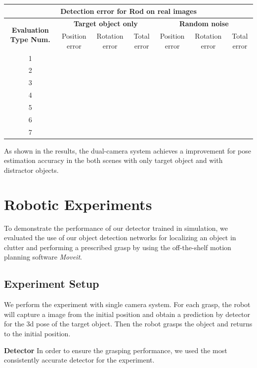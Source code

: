 \begin{table}[]
	\begin{tabular}{|c|c|c|c|c|c|c|}
		\hline
		\multicolumn{7}{|c|}{\textbf{Detection error for Rod on real images}} \\ \hline
		\multirow{2}{*}{\textbf{Evaluation Type Num.}} & \multicolumn{3}{c|}{\textbf{Target object only}} & \multicolumn{3}{c|}{\textbf{Random noise}} \\ \cline{2-7} 
		& Position error & Rotation error & Total error & Position error & Rotation error & Total error \\ \hline
		1 &  &  &  &  &  &  \\ \hline
		2 &  &  &  &  &  &  \\ \hline
		3 &  &  &  &  &  &  \\ \hline
		4 &  &  &  &  &  &  \\ \hline
		5 &  &  &  &  &  &  \\ \hline
		6 &  &  &  &  &  &  \\ \hline
		7 &  &  &  &  &  &  \\ \hline
	\end{tabular}
\end{table}

As shown in the results, the dual-camera system achieves a improvement for pose estimation accuracy in the both scenes with only target object and with distractor objects.

\section{Robotic Experiments}
To demonstrate the performance of our detector trained in simulation, we evaluated the use of our object detection networks for localizing an object in clutter and performing a prescribed grasp by using the off-the-shelf motion planning software \textit{Moveit}\cite{sucan2013moveit}.

\subsection{Experiment Setup}
We perform the experiment with single camera system. For each grasp, the robot will capture a image from the initial position and obtain a prediction by detector for the 3d pose of the target object. Then the robot grasps the object and returns to the initial position.

\textbf{Detector}
In order to ensure the grasping performance, we used the most consistently accurate detector for the experiment.

